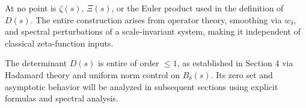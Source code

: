 \begin{remark}
At no point is \( \zeta(s) \), \( \Xi(s) \), or the Euler product used in the definition of \( D(s) \). The entire construction arises from operator theory, smoothing via \( w_\delta \), and spectral perturbations of a scale-invariant system, making it independent of classical zeta-function inputs.
\end{remark}

\begin{remark}
The determinant \( D(s) \) is entire of order \( \leq 1 \), as established in Section 4 via Hadamard theory and uniform norm control on \( B_\delta(s) \). Its zero set and asymptotic behavior will be analyzed in subsequent sections using explicit formulas and spectral analysis.
\end{remark}